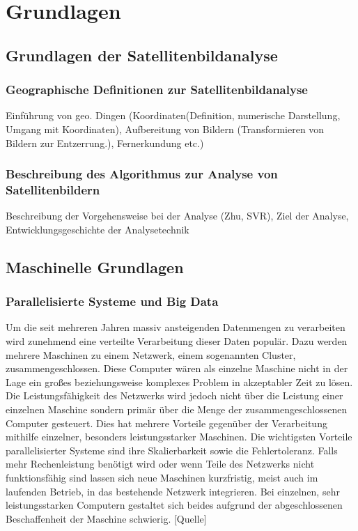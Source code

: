 \chapter{Grundlagen}
\section[Grundlagen zur Satellitenbildanalyse]{Grundlagen der Satellitenbildanalyse}
\subsection{Geographische Definitionen zur Satellitenbildanalyse}
Einführung von geo. Dingen (Koordinaten(Definition, numerische Darstellung, Umgang mit Koordinaten), Aufbereitung von Bildern (Transformieren von Bildern zur Entzerrung.), Fernerkundung etc.)
\subsection[Beschreibung des Algorithmus]{Beschreibung des Algorithmus zur Analyse von Satellitenbildern}
Beschreibung der Vorgehensweise bei der Analyse (Zhu, SVR), Ziel der Analyse, Entwicklungsgeschichte der Analysetechnik

\section{Maschinelle Grundlagen}
\subsection{Parallelisierte Systeme und Big Data}
Um die seit mehreren Jahren massiv ansteigenden Datenmengen \cite{EMC2014} zu verarbeiten wird zunehmend eine verteilte Verarbeitung dieser Daten populär. Dazu werden mehrere Maschinen zu einem Netzwerk, einem sogenannten Cluster, zusammengeschlossen. Diese Computer wären als einzelne Maschine nicht in der Lage ein großes beziehungsweise komplexes Problem in akzeptabler Zeit zu lösen. Die Leistungsfähigkeit des Netzwerks wird jedoch nicht über die Leistung einer einzelnen Maschine sondern primär über die Menge der zusammengeschlossenen Computer gesteuert. Dies hat mehrere Vorteile gegenüber der Verarbeitung mithilfe einzelner, besonders leistungsstarker Maschinen. Die wichtigsten Vorteile parallelisierter Systeme sind ihre Skalierbarkeit sowie die Fehlertoleranz. Falls mehr Rechenleistung benötigt wird oder wenn Teile des Netzwerks nicht funktionsfähig sind lassen sich neue Maschinen kurzfristig, meist auch im laufenden Betrieb, in das bestehende Netzwerk integrieren. Bei einzelnen, sehr leistungsstarken Computern gestaltet sich beides aufgrund der abgeschlossenen Beschaffenheit der Maschine schwierig. [Quelle]

